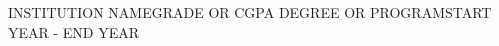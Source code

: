 
\resumeSubheading
  {INSTITUTION NAME}{GRADE OR CGPA}
  {DEGREE OR PROGRAM}{START YEAR - END YEAR}

